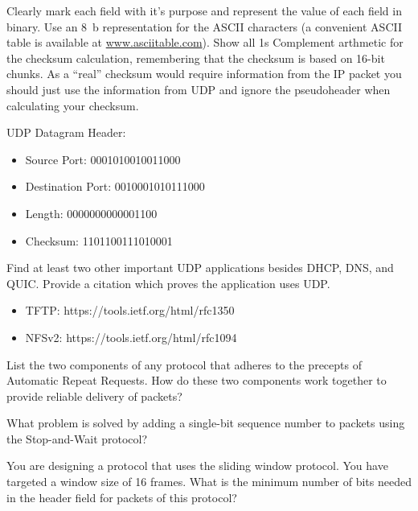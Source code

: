 \documentclass[12pt,addpoints,answers]{exam}
\begin{document}
\begin{questions}
Clearly mark each field with it's purpose and represent the value of each field in binary. Use an \SI{8}{b} representation for the ASCII characters (a convenient ASCII table is available at \url{www.asciitable.com}). Show all 1s Complement arthmetic for the checksum calculation, remembering that the checksum is based on 16-bit chunks. As a ``real'' checksum would require information from the IP packet you should just use the information from UDP and ignore the pseudoheader when calculating your checksum.
\begin{solution}
	UDP Datagram Header:
	\begin{itemize}
		\item Source Port: 0001010010011000
		\item Destination Port: 0010001010111000
		\item Length: 0000000000001100
		\item Checksum: 1101100111010001
	\end{itemize}
\end{solution}

\question[4] Find at least two other important UDP applications besides DHCP, DNS, and QUIC. Provide a citation which proves the application uses UDP.
\begin{solution}
	\begin{itemize}
		\item TFTP:  https://tools.ietf.org/html/rfc1350
		\item NFSv2: https://tools.ietf.org/html/rfc1094
	\end{itemize}
\end{solution}

\question[8] List the two components of any protocol that adheres to the precepts of Automatic Repeat Requests. How do these two components work together to provide reliable delivery of packets?
\begin{solution}
\end{solution}

\question[2] What problem is solved by adding a single-bit sequence number to packets using the Stop-and-Wait protocol?
\begin{solution}
\end{solution}

\question[5] You are designing a protocol that uses the sliding window protocol. You have targeted a window size of 16 frames. What is the minimum number of bits needed in the header field for packets of this protocol?
\begin{solution}
\end{solution}


\end{questions}
\end{document}

